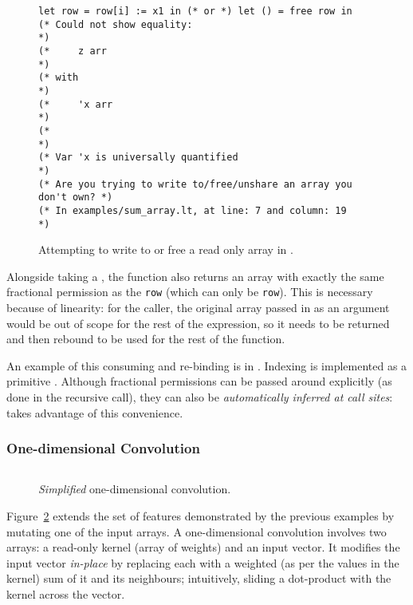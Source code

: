 \begin{figure}[t]
    \centering
    \begin{verbatim}
let row = row[i] := x1 in (* or *) let () = free row in
(* Could not show equality:                                        *)
(*     z arr                                                       *)
(* with                                                            *)
(*     'x arr                                                      *)
(*                                                                 *)
(* Var 'x is universally quantified                                *)
(* Are you trying to write to/free/unshare an array you don't own? *)
(* In examples/sum_array.lt, at line: 7 and column: 19             *)
    \end{verbatim}
    \caption{Attempting to write to or free a read only array in
    \lang.}\label{fig:lang_errormsg}
\end{figure}

Alongside taking a , the function also returns an array
with exactly the same fractional permission as the \texttt{row} (which can only
be \texttt{row}).  This is necessary because of linearity: for the caller, the
original array passed in as an argument would be out of scope for the rest of
the expression, so it needs to be returned and then rebound to be used for the
rest of the function.

An example of this consuming and re-binding is in . Indexing is implemented as a primitive . Although fractional permissions can be passed around
explicitly  (as done in the recursive call), they can also be
\emph{automatically inferred at call sites}: 
takes advantage of this convenience.

\subsubsection{One-dimensional Convolution}

\begin{figure}[t]
    \centering
    \inputminted[fontsize=\small]{ocaml}{../../examples/weighted_avg_infer.lt}
    \caption{\emph{Simplified} one-dimensional convolution.}\label{fig:lang_oned_conv}
\end{figure}

Figure~\ref{fig:lang_oned_conv} extends the set of features demonstrated by the
previous examples by mutating one of the input arrays. A one-dimensional
convolution involves two arrays: a read-only kernel (array of weights) and an
input vector. It modifies the input vector \emph{in-place} by replacing each
 with a weighted (as per the values in the kernel) sum of it
and its neighbours; intuitively, sliding a dot-product with the kernel across
the vector.

